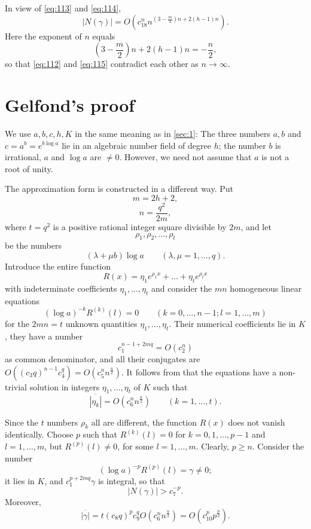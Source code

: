 In view of \eqref{eq:113} and \eqref{eq:114},
\begin{equation}
|N(\gamma)| = O\left(c_{18}^n n^{(3-\frac{m}{2})n+2(h-1)n}\right). \tag{115}\label{eq:115}
\end{equation}
Here the exponent of $n$ equals
\[
(3 - \frac{m}{2}) n + 2(h-1)n = -\frac{n}{2},
\]
so that \eqref{eq:112} and \eqref{eq:115} contradict each other as $n \to \infty$.

\section{Gelfond's proof}\label{sec:2}

We use $a, b, c, h, K$ in the same meaning as in \autoref{sec:1}: The three numbers $a, b$ and $c = a^b = e^{b \log a}$ lie in an algebraic number field of degree $h$; the number $b$ is irrational, $a$ and $\log a$ are $\neq 0$. However, we need not assume that $a$ is not a root of unity.

The approximation form is constructed in a different way. Put
\[
m = 2h + 2,
\]
\[
n = \frac{q^2}{2m},
\]
where $t = q^2$ is a positive rational integer square divisible by $2m$, and let
\[
\rho_1, \rho_2, \dots, \rho_t
\]
be the numbers
\[
(\lambda + \mu b) \log a \qquad (\lambda, \mu = 1, \dots, q).
\]
Introduce the entire function
\[
R(x) = \eta_1 e^{\rho_1 x} + \dots + \eta_t e^{\rho_t x}
\]
with indeterminate coefficients $\eta_1, \dots, \eta_t$ and consider the $mn$ homogeneous linear equations
\[
(\log a)^{-k} R^{(k)}(l) = 0 \qquad (k=0,\dots,n-1; l=1,\dots,m)
\]
for the $2mn = t$ unknown quantities $\eta_1, \dots, \eta_t$. Their numerical coefficients lie in $K$, they have a number
\[
c_1^{n-1+2mq} = O(c_2^n)
\]
as common denominator, and all their conjugates are $O((c_3 q)^{n-1} c_4^q) = O(c_5^n n^{\frac{n}{2}})$. It follows from  that the equations have a non-trivial solution in integers $\eta_1, \dots, \eta_t$ of $K$ such that
\[
\overline{|\eta_k|} = O(c_6^n n^{\frac{n}{2}}) \qquad (k=1,\dots,t).
\]

Since the $t$ numbers $\rho_k$ all are different, the function $R(x)$ does not vanish identically. Choose $p$ such that $R^{(k)}(l) = 0$ for $k = 0, 1, \dots, p-1$ and $l = 1, \dots, m$, but $R^{(p)}(l) \neq 0$, for some $l = 1, \dots, m$. Clearly, $p \ge n$. Consider the number
\begin{equation}
(\log a)^{-p} R^{(p)}(l) = \gamma \neq 0; \tag{116}\label{eq:116}
\end{equation}
it lies in $K$, and $c_1^{p+2mq} \gamma$ is integral, so that
\begin{equation}
|N(\gamma)| > c_7^{-p}. \tag{117}\label{eq:117}
\end{equation}
Moreover,
\begin{equation}
\overline{|\gamma|} = t (c_8 q)^p c_9^q O(c_6^n n^{\frac{n}{2}}) = O(c_{10}^p p^{\frac{p}{2}}). \tag{118}\label{eq:118}
\end{equation}

